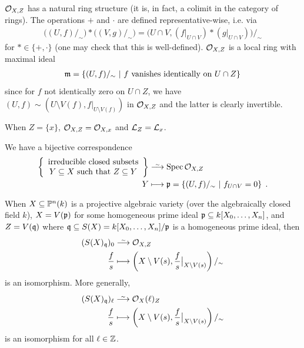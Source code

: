 \documentclass[a4paper,parskip=half,numbers=enddot, DIV=12]{scrreprt}
\begin{document}
    $\mathcal{O}_{X,Z}$ has a natural ring structure (it is, in fact, a colimit in the category of rings). The operations $+$ and $\cdot$ are defined representative-wise, i.e. via 
    \begin{align*}
        \big((U,f)/_\sim\big) * \big((V,g)/_\sim\big) = \big(U\cap V, (f|_{U\cap V})* (g|_{U\cap V})\big)/_\sim
    \end{align*}
    for $*\in\{+,\cdot\}$ (one may check that this is well-defined). $\mathcal{O}_{X,Z}$ is a local ring with maximal ideal
    \begin{align*}
        \mathfrak{m} = \left\{(U,f)/_\sim \ \middle|\  f\text{ vanishes identically on }U\cap Z\right\}
    \end{align*}
    since for $f$ not identically zero on $U\cap Z$, we have $(U,f)\sim\left(U\setminus V(f),f|_{U\setminus V(f)}\right)$ in $\mathcal{O}_{X,Z}$ and the latter is clearly invertible.
\begin{prop}
    \begin{alphanumerate}
    \item {}
        When $Z=\{x\}$, $\mathcal{O}_{X,Z} = \mathcal{O}_{X,x}$ and $\mathcal{L}_Z = \mathcal{L}_x$.
    \item   
	    We have a bijective correspondence
        \begin{align*}
	        \left\{
	        \begin{array}{c}
		        \text{irreducible closed subsets}\\
		        Y\subseteq X\text{ such that }Z\subseteq Y
	        \end{array}\right\}&\isomorphism\Spec \Oo_{X,Z}\\
            Y&\longmapsto \pp = \left\{(U,f)/_\sim\st f_{U\cap V} = 0\right\}\;.
        \end{align*}
    \item 
        When $X\subseteq \mathbb{P}^n(k)$ is a projective algebraic variety (over the algebraically closed field $k$), $X=V(\mathfrak{p})$ for some homogeneous prime ideal $\mathfrak{p}\subseteq k[X_0,\ldots,X_n]$, and $Z= V(\mathfrak{q})$ where $\mathfrak{q}\subseteq S(X) = k[X_0,\ldots, X_n]/\mathfrak{p}$ is a homogeneous prime ideal, then
        \begin{align*}
            (S(X)_\qq)_0 &\isomorphism \Oo_{X,Z}\\
            \frac{f}{s} &\longmapsto \left(X\setminus V(s) , \frac{f}{s}\big|_{X\setminus V(s)}\right)/_\sim
           \end{align*}
           is an isomorphism. More generally,
           \begin{align*}
            (S(X)_\qq)_\ell &\isomorphism \Oo_X(\ell)_Z\\
            \frac{f}{s} &\longmapsto \left(X\setminus V(s) , \frac{f}{s}\big|_{X\setminus V(s)}\right)/_\sim
        \end{align*}
        is an isomorphism for all $\ell\in \mathbb{Z}$.
    \end{alphanumerate}
\end{prop}
\end{document}
